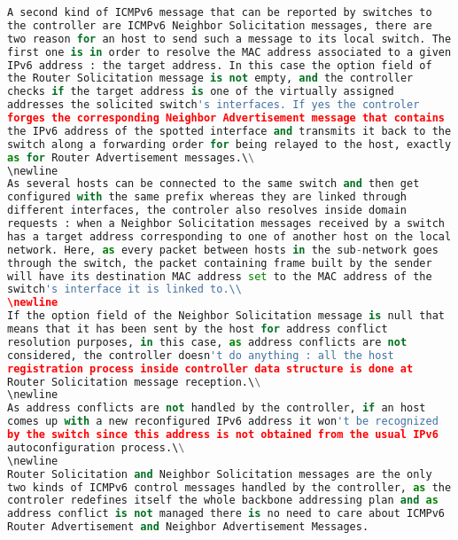 \documentclass{article}
\begin{document}
\begin{lstlisting}[frame=single,language=Python]
A second kind of ICMPv6 message that can be reported by switches to
the controller are ICMPv6 Neighbor Solicitation messages, there are
two reason for an host to send such a message to its local switch. The
first one is in order to resolve the MAC address associated to a given
IPv6 address : the target address. In this case the option field of
the Router Solicitation message is not empty, and the controller
checks if the target address is one of the virtually assigned
addresses the solicited switch's interfaces. If yes the controler
forges the corresponding Neighbor Advertisement message that contains
the IPv6 address of the spotted interface and transmits it back to the
switch along a forwarding order for being relayed to the host, exactly
as for Router Advertisement messages.\\
\newline
As several hosts can be connected to the same switch and then get
configured with the same prefix whereas they are linked through
different interfaces, the controler also resolves inside domain
requests : when a Neighbor Solicitation messages received by a switch
has a target address corresponding to one of another host on the local
network. Here, as every packet between hosts in the sub-network goes
through the switch, the packet containing frame built by the sender
will have its destination MAC address set to the MAC address of the
switch's interface it is linked to.\\
\newline
If the option field of the Neighbor Solicitation message is null that
means that it has been sent by the host for address conflict
resolution purposes, in this case, as address conflicts are not
considered, the controller doesn't do anything : all the host
registration process inside controller data structure is done at
Router Solicitation message reception.\\
\newline
As address conflicts are not handled by the controller, if an host
comes up with a new reconfigured IPv6 address it won't be recognized
by the switch since this address is not obtained from the usual IPv6
autoconfiguration process.\\
\newline
Router Solicitation and Neighbor Solicitation messages are the only
two kinds of ICMPv6 control messages handled by the controller, as the
controler redefines itself the whole backbone addressing plan and as
address conflict is not managed there is no need to care about ICMPv6
Router Advertisement and Neighbor Advertisement Messages.


\end{lstlisting}
\end{document}
